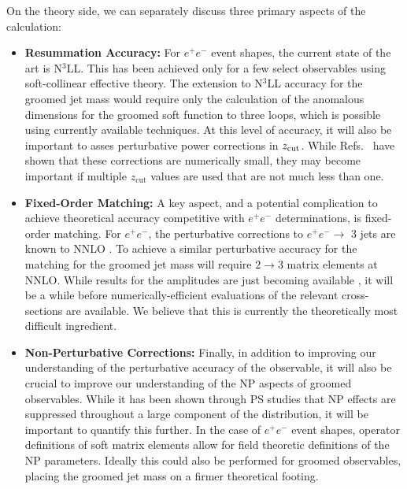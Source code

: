 \documentclass[11pt,letterpaper]{article}
\DeclareRobustCommand{\Refs}[1]{Refs.~\cite{#1}}
\newcommand{\zcut}{z_{\rm cut}}
\begin{document}
On the theory side, we can separately discuss three primary aspects of the calculation:
%
\begin{itemize}
\item {\bf Resummation Accuracy:} For $e^+e^-$ event shapes, the current state of the art is N$^3$LL.
%
This has been achieved only for a few select observables using soft-collinear effective theory.
%
The extension to N$^3$LL accuracy for the groomed jet mass would require only the calculation of the anomalous dimensions for the groomed soft function to three loops, which is possible using currently available techniques.
%
At this level of accuracy, it will also be important to asses perturbative power corrections in $\zcut$.
%
While \Refs{Marzani:2017kqd,Marzani:2017mva} have shown that these corrections are numerically small, they may become important if multiple $z_\text{cut}$ values are used that are not much less than one.
%
\item {\bf Fixed-Order Matching:} A key aspect, and a potential complication to achieve theoretical accuracy competitive with $e^+e^-$ determinations, is fixed-order matching.
%
For $e^+e^-$, the perturbative corrections to $e^+e^- \to$ 3 jets are known to NNLO \cite{GehrmannDeRidder:2007hr,Gehrmann-DeRidder:2007nzq,Weinzierl:2008iv,Weinzierl:2009ms}.
%
To achieve a similar perturbative accuracy for the matching for the groomed jet mass will require $2\to 3$ matrix elements at NNLO.
%
While results for the amplitudes are just becoming available \cite{Gehrmann:2015bfy,Dunbar:2016aux,Badger:2013yda,Badger:2017jhb,Abreu:2017hqn}, it will be a while before numerically-efficient evaluations of the relevant cross-sections are available.
%
We believe that this is currently the theoretically most difficult ingredient.
%
\item {\bf Non-Perturbative Corrections:} Finally, in addition to improving our understanding of the perturbative accuracy of the observable, it will also be crucial to improve our understanding of the NP aspects of groomed observables.
%
While it has been shown through PS studies that NP effects are suppressed throughout a large component of the distribution, it will be important to quantify this further.
%
In the case of $e^+e^-$ event shapes, operator definitions of soft matrix elements allow for field theoretic definitions of the NP parameters.
%
Ideally this could also be performed for groomed observables, placing the groomed jet mass on a firmer theoretical footing.
%
\end{itemize}
\end{document}
